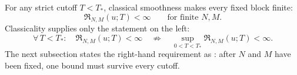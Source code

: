 For any strict cutoff \(T<T_*\), classical smoothness makes every fixed block finite:
\begin{equation}\label{eq:StrictSubintervalRectangleBound}
  \mathfrak R_{N,M}(u;T)<\infty
  \qquad\text{for finite }N,M.
\end{equation}
Classicality supplies only the statement on the left:
\[
  \forall\,T<T_*:\quad \mathfrak R_{N,M}(u;T)<\infty
  \quad\not\Longrightarrow\quad
  \sup_{0<T<T_*}\mathfrak R_{N,M}(u;T)<\infty.
\]
The next subsection states the right-hand requirement as : after \(N\) and \(M\) have been fixed, one bound must survive every cutoff.
